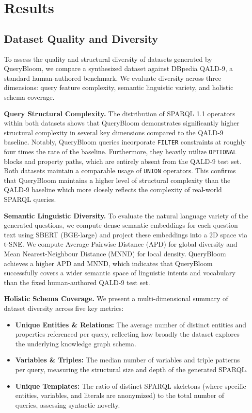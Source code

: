 \section{Results}
\label{sec:evaluation}

\subsection{Dataset Quality and Diversity}

\FloatBarrier

To assess the quality and structural diversity of datasets generated by QueryBloom, we compare a synthesized dataset against DBpedia QALD-9, a standard human-authored benchmark. We evaluate diversity across three dimensions: query feature complexity, semantic linguistic variety, and holistic schema coverage.


\textbf{Query Structural Complexity.} The distribution of SPARQL 1.1 operators within both datasets shows that QueryBloom demonstrates significantly higher structural complexity in several key dimensions compared to the QALD-9 baseline. Notably, QueryBloom queries incorporate \texttt{FILTER} constraints at roughly four times the rate of the baseline. Furthermore, they heavily utilize \texttt{OPTIONAL} blocks and property paths, which are entirely absent from the QALD-9 test set. Both datasets maintain a comparable usage of \texttt{UNION} operators. This confirms that QueryBloom maintains a higher level of structural complexity than the QALD-9 baseline which more closely reflects the complexity of real-world SPARQL queries.

\textbf{Semantic Linguistic Diversity.} To evaluate the natural language variety of the generated questions, we compute dense semantic embeddings for each question text using SBERT (BGE-large) and project these embeddings into a 2D space via t-SNE. We compute Average Pairwise Distance (APD) for global diversity and Mean Nearest-Neighbour Distance (MNND) for local density. QueryBloom achieves a higher APD and MNND, which indicates that QueryBloom successfully covers a wider semantic space of linguistic intents and vocabulary than the fixed human-authored QALD-9 test set.

\textbf{Holistic Schema Coverage.} We present a multi-dimensional summary of dataset diversity across five key metrics:
\begin{itemize}
    \item \textbf{Unique Entities \& Relations:} The average number of distinct entities and properties referenced per query, reflecting how broadly the dataset explores the underlying knowledge graph schema.
    \item \textbf{Variables \& Triples:} The median number of variables and triple patterns per query, measuring the structural size and depth of the generated SPARQL.
    \item \textbf{Unique Templates:} The ratio of distinct SPARQL skeletons (where specific entities, variables, and literals are anonymized) to the total number of queries, assessing syntactic novelty.
\end{itemize}

